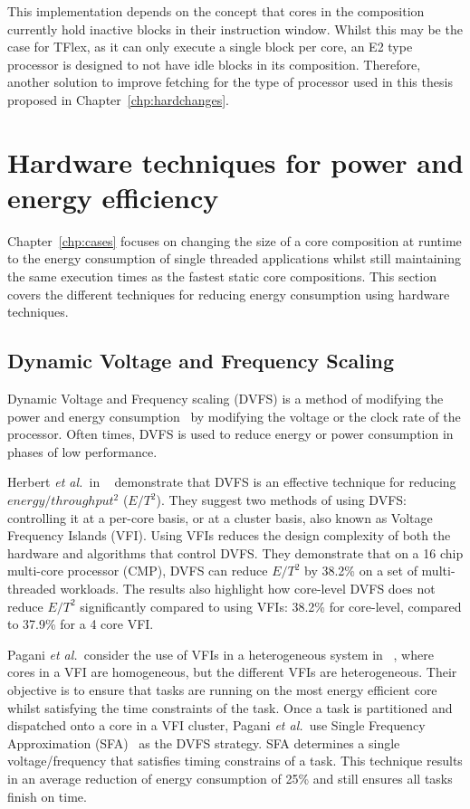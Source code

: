 This implementation depends on the concept that cores in the composition currently hold inactive blocks in their instruction window.
Whilst this may be the case for TFlex, as it can only execute a single block per core, an E2 type processor is designed to not have idle blocks in its composition.
Therefore, another solution to improve fetching for the type of processor used in this thesis proposed in Chapter~\ref{chp:hardchanges}.

\vspace{-1em}
\section{Hardware techniques for power and energy efficiency}

Chapter~\ref{chp:cases} focuses on changing the size of a core composition at runtime to the energy consumption of single threaded applications whilst still maintaining the same execution times as the fastest static core compositions.
This section covers the different techniques for reducing energy consumption using hardware techniques.

\subsection{Dynamic Voltage and Frequency Scaling}
Dynamic Voltage and Frequency scaling (DVFS) is a method of modifying the power and energy consumption~\cite{paganiEECHM2017} by modifying the voltage or the clock rate of the processor.
Often times, DVFS is used to reduce energy or power consumption in phases of low performance.

Herbert {\it et al.~}in ~\cite{herbertDVFS07} demonstrate that DVFS is an effective technique for reducing $energy/throughput^2$ ($E/T^2$).
They suggest two methods of using DVFS: controlling it at a per-core basis, or at a cluster basis, also known as Voltage Frequency Islands (VFI).
Using VFIs reduces the design complexity of both the hardware and algorithms that control DVFS.
They demonstrate that on a 16 chip multi-core processor (CMP), DVFS can reduce $E/T^2$ by 38.2\% on a set of multi-threaded workloads.
The results also highlight how core-level DVFS does not reduce $E/T^2$ significantly compared to using VFIs: 38.2\% for core-level, compared to 37.9\% for a 4 core VFI.

Pagani {\it et al.~}consider the use of VFIs in a heterogeneous system in ~\cite{paganiEECHM2017}, where cores in a VFI are homogeneous, but the different VFIs are heterogeneous.
Their objective is to ensure that tasks are running on the most energy efficient core whilst satisfying the time constraints of the task.
Once a task is partitioned and dispatched onto a core in a VFI cluster, Pagani {\it et al.~}use Single Frequency Approximation (SFA)~\cite{sfaScheme} as the DVFS strategy.
SFA determines a single voltage/frequency that satisfies timing constrains of a task.
This technique results in an average reduction of energy consumption of 25\% and still ensures all tasks finish on time.


